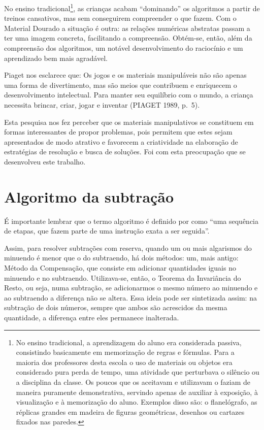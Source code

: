 \begin{refsection}
    No ensino tradicional\footnote{No ensino tradicional, a aprendizagem do aluno era considerada passiva, consistindo basicamente em memorização de regras e fórmulas. Para a maioria dos professores desta escola o uso de materiais ou objetos era considerado pura perda de tempo, uma atividade que perturbava o silêncio ou a disciplina da classe. Os poucos que os aceitavam e utilizavam o faziam de maneira puramente demonstrativa, servindo apenas de auxiliar à exposição, à visualização e à memorização do aluno. Exemplos disso são: o flanelógrafo, as réplicas grandes em madeira de figuras geométricas, desenhos ou cartazes fixados nas paredes.}, as crianças acabam ``dominando'' os algoritmos a partir de treinos cansativos, mas sem conseguirem compreender o que fazem. Com o Material Dourado a situação é outra: as relações numéricas abstratas passam a ter uma imagem concreta, facilitando a compreensão. Obtém-se, então, além da compreensão dos algoritmos, um notável desenvolvimento do raciocínio e um aprendizado bem mais agradável.  

    Piaget nos esclarece que: Os jogos e os materiais manipuláveis não são apenas uma forma de divertimento, mas são meios que contribuem e enriquecem o desenvolvimento intelectual. Para manter seu equilíbrio com o mundo, a criança necessita brincar, criar, jogar e inventar (PIAGET 1989, p.~5).

    Esta pesquisa nos fez perceber que os materiais manipulativos se constituem em formas interessantes de propor problemas, pois permitem que estes sejam apresentados de modo atrativo e favorecem a criatividade na elaboração de estratégias de resolução e busca de soluções. Foi com esta preocupação que se desenvolveu este trabalho.

    \section{Algoritmo da subtração}

    É importante lembrar que o termo algoritmo é definido por \textcite[p.~150]{CENTURIÓN1995Números} como “uma sequência de etapas, que fazem parte de uma instrução exata a ser seguida”.

    Assim, para resolver subtrações com reserva, quando um ou mais algarismos do minuendo é menor que o do subtraendo, há dois métodos: um, mais antigo: Método da Compensação, que consiste em adicionar quantidades iguais no minuendo e no subtraendo. Utilizava-se, então, o Teorema da Invariância do Resto, ou seja, numa subtração, se adicionarmos o mesmo número ao minuendo e ao subtraendo a diferença não se altera. Essa ideia pode ser sintetizada assim: na subtração de dois números, sempre que ambos são acrescidos da mesma quantidade, a diferença entre eles permanece inalterada.  


\end{refsection}
